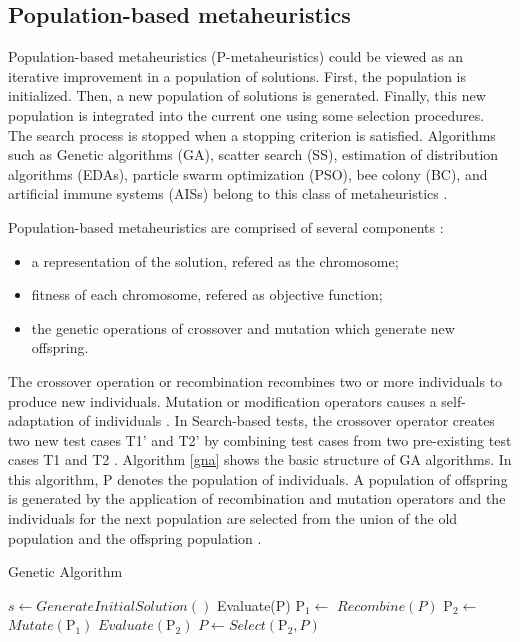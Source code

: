 \documentclass{report}
\begin{document}
\subsection{Population-based metaheuristics}

Population-based metaheuristics (P-metaheuristics) could be viewed as an iterative improvement in a population of solutions. First, the population is initialized. Then, a new population of solutions is generated. Finally, this new population is integrated into the current one using some selection procedures. The search process is stopped when a stopping criterion is satisfied. Algorithms such as Genetic algorithms (GA), scatter search (SS), estimation of distribution algorithms (EDAs), particle swarm optimization (PSO), bee colony (BC), and artificial immune systems (AISs) belong to this class of metaheuristics \cite{talbi2009metaheuristics}. 

Population-based metaheuristics are comprised of several components \cite{hong2000simultaneously} \cite{shousha2003performance} :

\begin{itemize}
\item a representation of the solution, refered as the chromosome;
\item fitness of each chromosome, refered as objective function;
\item the genetic operations of crossover and mutation which generate new offspring. 
\end{itemize}

The crossover operation or recombination recombines two or more individuals to produce new individuals. Mutation or modification operators causes a self-adaptation of individuals \cite{Blum2003}. In Search-based tests, the crossover operator creates two new test cases T1' and T2' by combining test cases from two pre-existing test cases T1 and T2 \cite{Aleti2016}. Algorithm \ref{gna} shows the basic structure of GA algorithms. In this algorithm, P denotes the population of individuals. A population of offspring is generated by the application of recombination and mutation operators and the individuals for the next population are selected from the union of the old population and the offspring population \cite{raidl2010metaheuristic}.


\begin{algorithm}[h]
  \caption{Genetic Algorithm}\label{gna}
  \begin{algorithmic}[1]
    
    \State $s\gets GenerateInitialSolution()$
    \State Evaluate(P)
    \State $\mbox{P}_1\gets$ $Recombine(P)$
    \State $\mbox{P}_2\gets$ $Mutate(\mbox{P}_1)$ 
    \State $Evaluate(\mbox{P}_2)$
    \State $P\gets Select(\mbox{P}_2,P)$
    \EndWhile
      
  \end{algorithmic}
\end{algorithm}
\end{document}
